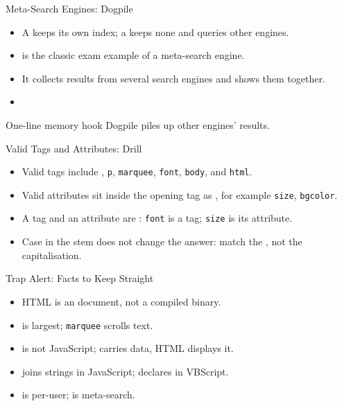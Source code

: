 \documentclass[aspectratio=169]{beamer}
\begin{document}
\begin{frame}{Meta-Search Engines: Dogpile}
  \begin{itemize}
    \item A  keeps its own index; a 
      keeps none and queries other engines.
    \item {} is the classic exam example of a meta-search engine.
    \item It collects results from several search engines and shows them together.
    \item {}
  \end{itemize}
  \begin{block}{One-line memory hook}
    Dogpile piles up other engines' results.
  \end{block}
\end{frame}

\begin{frame}{Valid Tags and Attributes: Drill}
  \begin{itemize}
    \item Valid tags include , \texttt{p}, \texttt{marquee},
      \texttt{font}, \texttt{body}, and \texttt{html}.
    \item Valid attributes sit inside the opening tag as
      , for example \texttt{size}, \texttt{bgcolor}.
    \item A tag and an attribute are : \texttt{font} is
      a tag; \texttt{size} is its attribute.
    \item Case in the stem does not change the answer: match the ,
      not the capitalisation.
  \end{itemize}
\end{frame}

\begin{frame}{Trap Alert: Facts to Keep Straight}
  \begin{itemize}
    \item HTML is an  document, not a compiled binary.
    \item {} is largest; \texttt{marquee} scrolls text.
    \item {} is not JavaScript;  carries data, HTML displays it.
    \item \key{\texttt{+}} joins strings in JavaScript; 
      declares in VBScript.
    \item {} is per-user;  is meta-search.
  \end{itemize}
\end{frame}
\end{document}
